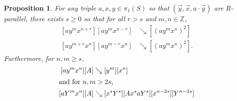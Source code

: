 \documentclass[11pt]{amsart}
\newcommand{\ora}[1]{\overrightarrow{#1}}
\numberwithin{equation}{section}
\numberwithin{figure}{section}
\newtheorem{proposition}[theorem]{Proposition}
\theoremstyle{definition}
\theoremstyle{plain}
\newcommand\bbZ{\ensuremath{\mathbb{Z}}}
\newcommand{\reducesto}{\mathrel{\searrow}}
\begin{document}
\begin{proposition}\label{prop:fundamental-ayx}
  For any triple $a,x,y\in\pi_1(S)$ so that $(\ora{y},\ora{x},a\cdot\ora{y})$ are R-parallel, there exists
  $s \ge 0$ so that for all $r > s$ and $m,n \in \bbZ$,
  \begin{align}
    \label{eq:crossuniform_n}
       [a y^m x^{n+r}][a y^m x^{n-r}] &\reducesto [(a y^m x^n)^2]\\
    \label{eq:crossuniform_m}
       [a y^{m+r} x^n][a y^{m-r} x^n] &\reducesto [(a y^m x^n)^2].
  \end{align}
  Furthermore, for $n,m \ge s$,
  \begin{align}\label{eq:cancel-ayx}
    [a y^m x^n][A] &\reducesto [y^m][x^n]\\
    \intertext{and for $n,m > 2s$,}
    \label{eq:crossbelowy}
    [a Y^m x^n][A] &\reducesto [x^s Y^s] [A x^s a Y^s] [x^{n-2s}] [Y^{n-2s}]
  \end{align}
\end{proposition}
\end{document}

